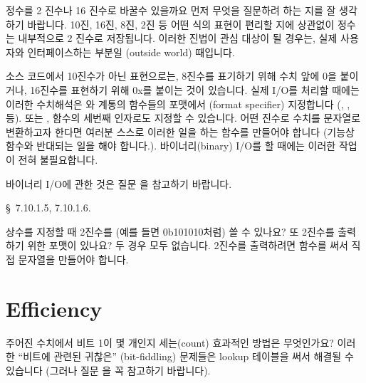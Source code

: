 \begin{faq}
	정수를 2 진수나 16 진수로 바꿀수 있을까요
\A
	먼저 무엇을 질문하려 하는 지를 잘 생각하기 바랍니다.
	10진, 16진, 8진, 2진 등 어떤 식의 표현이 편리할 지에 상관없이
	정수는 내부적으로 2 진수로 저장됩니다.
	이러한 진법이 관심 대상이 될 경우는, 실제 사용자와
	인터페이스하는 부분일 (outside world) 때입니다.

	소스 코드에서 10진수가 아닌 표현으로는, 8진수를 표기하기 위해
	수치 앞에 0을 붙이거나, 16진수를 표현하기 위해 0x를 붙이는 것이
	있습니다.  실제 I/O를 처리할 때에는 이러한 수치해석은
	와  계통의 함수들의 포맷에서 (format specifier)
	지정합니다 (, ,  등).  또는 ,
	 함수의 세번째 인자로도 지정할 수 있습니다.
	어떤 진수로 수치를 문자열로 변환하고자 한다면 여러분 스스로
	이러한 일을 하는 함수를 만들어야 합니다 (기능상  함수와
	반대되는 일을 해야 합니다.).  바이너리(binary) I/O를 할 때에는
	이러한 작업이 전혀 불필요합니다.

	바이너리 I/O에 관한 것은 질문 을 참고하기 바랍니다.

\R
	\cite{c89} \S\ 7.10.1.5, 7.10.1.6.
\end{faq}

\begin{faq}
	상수를 지정할 때 2진수를 (예를 들면 0b101010처럼) 쓸 수 있나요?
	또 2진수를 출력하기 위한  포맷이 있나요?
\A
	두 경우 모두 없습니다.  2진수를 출력하려면  함수를
	써서 직접 문자열을 만들어야 합니다.  
\end{faq}

\section{Efficiency}	\label{sec:efficiency}

\begin{faq}
	주어진 수치에서 비트 1이 몇 개인지 세는(count) 효과적인
	방법은 무엇인가요?
\A
	이러한 ``비트에 관련된 귀찮은'' (bit-fiddling) 문제들은
	lookup 테이블을 써서 해결될 수 있습니다 (그러나 질문 을
	꼭 참고하기 바랍니다).
\end{faq}

